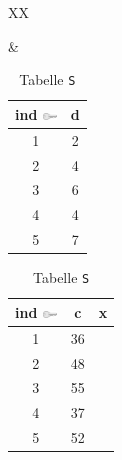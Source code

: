 \begin{frame}
\begin{table}[htbp]
\begin{tabularx}{\linewidth}{XX}
\begin{minipage}{\linewidth}
\begin{subtable}[b]{\linewidth}
    \end{subtable}
  \end{minipage}
  &
  \begin{minipage}{\linewidth}
    \begin{subtable}[b]{\linewidth}
     \centering
     \begin{tabular}{cc}
      \toprule
      \ttfamily ind \includegraphics[width=1em]{Bilder/Key} & \ttfamily d \\
      \midrule
      1 & 2 \\
      2 & 4 \\
      3 & 6 \\
      4 & 4 \\
      5 & 7 \\
      \bottomrule
     \end{tabular}
    \caption{Tabelle \texttt{T}}
    \end{subtable}
    \bigskip\bigskip
    
    \begin{subtable}[b]{\linewidth}
     \centering
     \begin{tabular}{ccc}
      \toprule
      \ttfamily ind \includegraphics[width=1em]{Bilder/Key} & \ttfamily c & \ttfamily x \\
      \midrule
      1 & 36 \\
      2 & 48 \\
      3 & 55 \\
      4 & 37 \\
      5 & 52 \\
      \bottomrule
     \end{tabular}
    \caption{Tabelle \texttt{S}}
    \end{subtable}
  \end{minipage}
 \end{tabularx}
\end{table}
\end{frame}

